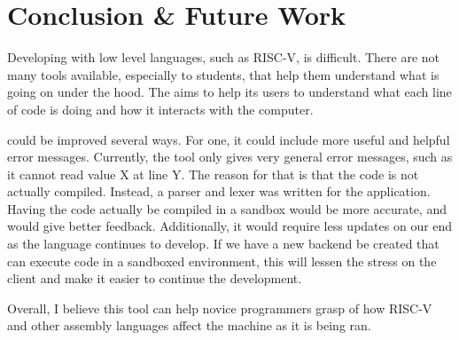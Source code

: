


\section{Conclusion \& Future Work}



Developing with low level languages, such as RISC-V, is difficult.
%
There are not many tools available, especially to students, that help them understand what is going on under the hood.
%
The \tool{} aims to help its users to understand what each line of code is doing and how it interacts with the computer.
%


\tool{} could be improved several ways.
%
For one, it could include more useful and helpful error messages.
%
Currently, the tool only gives very general error messages, such as it cannot read value X at line Y.
%
The reason for that is that the code is not actually compiled.
%
Instead, a parser and lexer was written for the application.
%
Having the code actually be compiled in a sandbox would be more accurate, and would give better feedback.
%
Additionally, it would require less updates on our end as the language continues to develop.
%
If we have a new backend be created that can execute code in a sandboxed environment, this will lessen the stress on the client and make it easier to continue the development.
%


Overall, I believe this tool can help novice programmers grasp of how RISC-V and other assembly languages affect the machine as it is being ran.